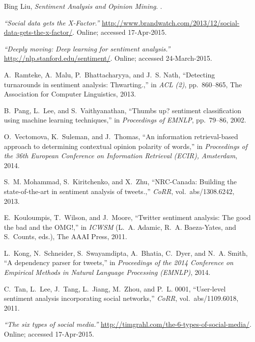 \begin{thebibliography}{10}

{Bing Liu}, {\em Sentiment Analysis and Opinion Mining}.
.

\emph{``Social data gets the {X-Factor}.''}
  \url{http://www.brandwatch.com/2013/12/social-data-gets-the-x-factor/}.
\newblock Online; accessed 17-Apr-2015.

\emph{``Deeply moving: Deep learning for sentiment analysis.''}
  \url{http://nlp.stanford.edu/sentiment/}.
\newblock Online; accessed 24-March-2015.

A.~Ramteke, A.~Malu, P.~Bhattacharyya, and J.~S. Nath, ``Detecting turnarounds
  in sentiment analysis: Thwarting.,'' in {\em ACL (2)}, pp.~860--865, The
  Association for Computer Linguistics, 2013.

B.~Pang, L.~Lee, and S.~Vaithyanathan, ``Thumbs up? sentiment classification
  using machine learning techniques,'' in {\em Proceedings of EMNLP},
  pp.~79--86, 2002.

O.~Vectomova, K.~Suleman, and J.~Thomas, ``An information retrieval-based
  approach to determining contextual opinion polarity of words,'' in {\em
  Proceedings of the 36th European Conference on Information Retrieval (ECIR),
  Amsterdam}, 2014.

S.~M. Mohammad, S.~Kiritchenko, and X.~Zhu, ``{NRC-Canada}: Building the
  state-of-the-art in sentiment analysis of tweets.,'' {\em CoRR},
  vol.~abs/1308.6242, 2013.

E.~Kouloumpis, T.~Wilson, and J.~Moore, ``Twitter sentiment analysis: The good
  the bad and the {OMG}!,'' in {\em ICWSM} (L.~A. Adamic, R.~A. Baeza-Yates, and
  S.~Counts, eds.), The AAAI Press, 2011.

L.~Kong, N.~Schneider, S.~Swayamdipta, A.~Bhatia, C.~Dyer, and N.~A. Smith, ``A
  dependency parser for tweets,'' in {\em Proceedings of the 2014 Conference on
  Empirical Methods in Natural Language Processing (EMNLP)}, 2014.

C.~Tan, L.~Lee, J.~Tang, L.~Jiang, M.~Zhou, and P.~L. 0001, ``User-level
  sentiment analysis incorporating social networks,'' {\em CoRR},
  vol.~abs/1109.6018, 2011.

\emph{``The six types of social media.''}
  \url{http://timgrahl.com/the-6-types-of-social-media/}.
\newblock Online; accessed 17-Apr-2015.

\end{thebibliography}